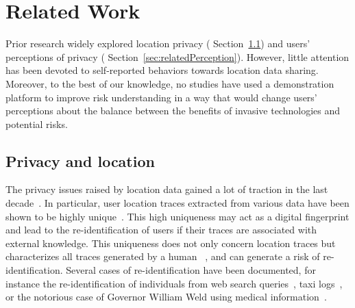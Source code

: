 \section{Related Work}
\label{sec:related}


Prior research widely 
explored location privacy (%
Section~\ref{sec:relatedPrivacy}) and users' perceptions of privacy (%
Section~\ref{sec:relatedPerception}).
However, little attention has been devoted to self-reported behaviors towards location data sharing. Moreover, to the best of our knowledge, no studies have used a demonstration platform to improve risk understanding in a way that would change users’ perceptions about the balance between the benefits of invasive technologies and potential risks.

\subsection{Privacy and location}
\label{sec:relatedPrivacy}

The privacy issues raised by location data gained a lot of traction in the last decade~\cite{8482357}. 
In particular, user location traces extracted from various data have been shown to be highly unique~\cite{de2013unique,Zang:2011:ALD:2030613.2030630}. %
This high uniqueness may act as a digital fingerprint and lead to the re-identification of users if their traces are associated with external knowledge.
This uniqueness does not only concern location traces but characterizes all traces generated by a human ~\cite{journals/popets/Kurtz16, eckersley2010unique, journals/popets/Overdorf16}, and can generate a risk of re-identification.
Several cases of re-identification have been documented, for instance the re-identification of individuals from web search queries~\cite{article2},  %
taxi logs~\cite{zhang2016inferring}, or the notorious case of Governor William Weld using medical information~\cite{article}.

